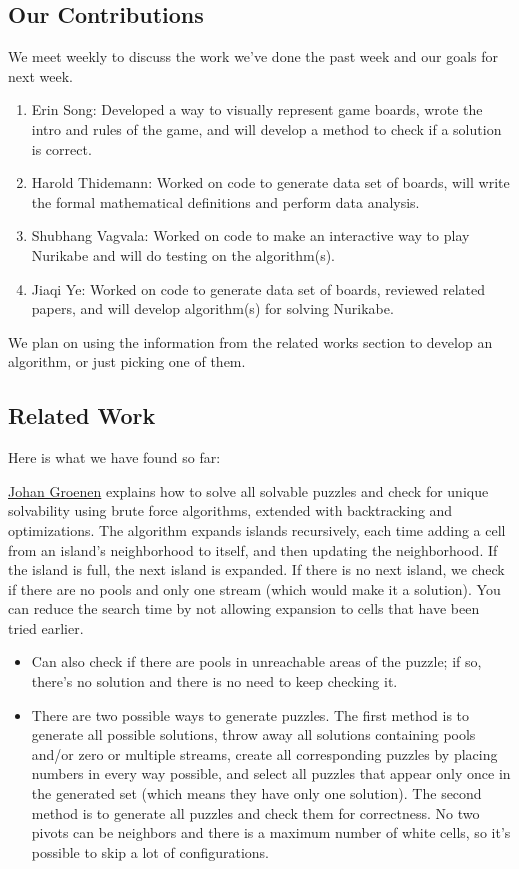 \documentclass{article}
\theoremstyle{definition}
\begin{document}
\subsection{Our Contributions}\label{sec:contrib}
We meet weekly to discuss the work we've done the past week and our goals for next week.

\begin{enumerate}
    \item Erin Song: Developed a way to visually represent game boards, wrote the intro and rules of the game, and will develop a method to check if a solution is correct.
    \item Harold Thidemann: Worked on code to generate data set of boards, will write the formal mathematical definitions and perform data analysis. 
    \item Shubhang Vagvala: Worked on code to make an interactive way to play Nurikabe and will do testing on the algorithm(s).
    \item Jiaqi Ye: Worked on code to generate data set of boards, reviewed related papers, and will develop algorithm(s) for solving Nurikabe.
\end{enumerate}

We plan on using the information from the related works section to develop an algorithm, or just picking one of them.

\subsection{Related Work}\label{sec:related}
Here is what we have found so far:

\hyperlink{https://theses.liacs.nl/pdf/18-JohanGroenen.pdf}{Johan Groenen} explains how to solve all solvable puzzles and check for unique solvability using brute force algorithms, extended with backtracking and optimizations. The algorithm expands islands recursively, each time adding a cell from an island’s neighborhood to itself, and then updating the neighborhood. If the island is full, the next island is expanded. If there is no next island, we check if there are no pools and only one stream (which would make it a solution). You can reduce the search time by not allowing expansion to cells that have been tried earlier.
\begin{itemize}
  \item Can also check if there are pools in unreachable areas of the puzzle; if so, there’s no solution and there is no need to keep checking it.
  \item There are two possible ways to generate puzzles. The first method is to generate all possible solutions, throw away all solutions containing pools and/or zero or multiple streams, create all corresponding puzzles by placing numbers in every way possible, and select all puzzles that appear only once in the generated set (which means they have only one solution). The second method is to generate all puzzles and check them for correctness. No two pivots can be neighbors and there is a maximum number of white cells, so it’s possible to skip a lot of configurations.
\end{itemize}
\end{document}
